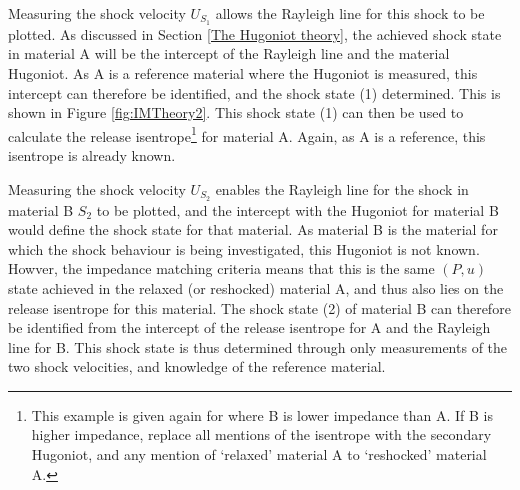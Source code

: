 Measuring the shock velocity $U_{S_1}$ allows the Rayleigh line for this shock to be plotted. As discussed in Section \ref{The Hugoniot theory}, the achieved shock state in material A will be the intercept of the Rayleigh line and the material Hugoniot. As A is a reference material where the Hugoniot is measured, this intercept can therefore be identified, and the shock state (1) determined. This is shown in Figure \ref{fig:IMTheory2}. This shock state (1) can then be used to calculate the release isentrope\footnote{This example is given again for where B is lower impedance than A. If B is higher impedance, replace all mentions of the isentrope with the secondary Hugoniot, and any mention of `relaxed' material A to `reshocked' material A.} for material A. Again, as A is a reference, this isentrope is already known.

Measuring the shock velocity $U_{S_2}$ enables the Rayleigh line for the shock in material B $S_2$ to be plotted, and the intercept with the Hugoniot for material B would define the shock state for that material. As material B is the material for which the shock behaviour is being investigated, this Hugoniot is not known. Howver, the impedance matching criteria means that this is the same $(P, u)$ state achieved in the relaxed (or reshocked) material A, and thus also lies on the release isentrope for this material. The shock state (2) of material B can therefore be identified from the intercept of the release isentrope for A and the Rayleigh line for B. This shock state is thus determined through only measurements of the two shock velocities, and knowledge of the reference material.

